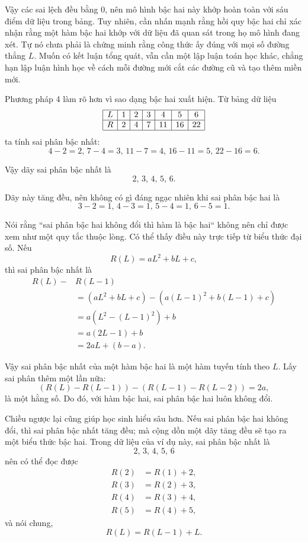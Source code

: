 {    Vậy các sai lệch đều bằng $0$, nên mô hình bậc hai này khớp hoàn toàn với sáu điểm dữ liệu trong bảng. Tuy nhiên, cần nhấn mạnh rằng hồi quy bậc hai chỉ xác nhận rằng một hàm bậc hai khớp với dữ liệu đã quan sát trong họ mô hình đang xét. Tự nó chưa phải là chứng minh rằng công thức ấy đúng với mọi số đường thẳng $L$. Muốn có kết luận tổng quát, vẫn cần một lập luận toán học khác, chẳng hạn lập luận hình học về cách mỗi đường mới cắt các đường cũ và tạo thêm miền mới.

    Phương pháp 4 làm rõ hơn vì sao dạng bậc hai xuất hiện. Từ bảng dữ liệu
    $$
      \begin{array}{|c|c|c|c|c|c|c|}
      \hline
      L & 1 & 2 & 3 & 4 & 5 & 6\\
      \hline
      R & 2 & 4 & 7 & 11 & 16 & 22\\
      \hline
      \end{array}
    $$
    ta tính sai phân bậc nhất:
    $$
    4-2=2,\, 7-4=3,\, 11-7=4,\, 16-11=5,\, 22-16=6.
    $$

    Vậy dãy sai phân bậc nhất là
    $$
        2,\, 3,\, 4,\, 5,\, 6.
    $$

    Dãy này tăng đều, nên không có gì đáng ngạc nhiên khi sai phân bậc hai là
    $$
        3-2=1,\, 4-3=1,\, 5-4=1,\, 6-5=1.
    $$

    Nói rằng ``sai phân bậc hai không đổi thì hàm là bậc hai`` không nên chỉ được xem như một quy tắc thuộc lòng. Có thể thấy điều này trực tiếp từ biểu thức đại số. Nếu
    $$
        R(L)=aL^2+bL+c,
    $$
    thì sai phân bậc nhất là
    \begin{align*}
        R(L)-&R(L-1)\\
            &=\left(aL^2+bL+c\right)-\left(a(L-1)^2+b(L-1)+c\right)\\
            &=a\left(L^2-(L-1)^2\right)+b\\
            &=a(2L-1)+b\\
            &=2aL+(b-a).
    \end{align*}

    Vậy sai phân bậc nhất của một hàm bậc hai là một hàm tuyến tính theo $L$. Lấy sai phân thêm một lần nữa:
    $$
      \left(R(L)-R(L-1)\right)-\left(R(L-1)-R(L-2)\right)=2a,
    $$
    là một hằng số. Do đó, với hàm bậc hai, sai phân bậc hai luôn không đổi.

    Chiều ngược lại cũng giúp học sinh hiểu sâu hơn. Nếu sai phân bậc hai không đổi, thì sai phân bậc nhất tăng đều; mà cộng dồn một dãy tăng đều sẽ tạo ra một biểu thức bậc hai. Trong dữ liệu của ví dụ này, sai phân bậc nhất là
    $$
        2,\, 3,\, 4,\, 5,\, 6
    $$
    nên có thể đọc được
    \begin{align*}
        R(2)&=R(1)+2,\\
        R(3)&=R(2)+3,\\
        R(4)&=R(3)+4,\\
        R(5)&=R(4)+5,
    \end{align*}
    và nói chung,
    $$
        R(L)=R(L-1)+L.
    $$

}
